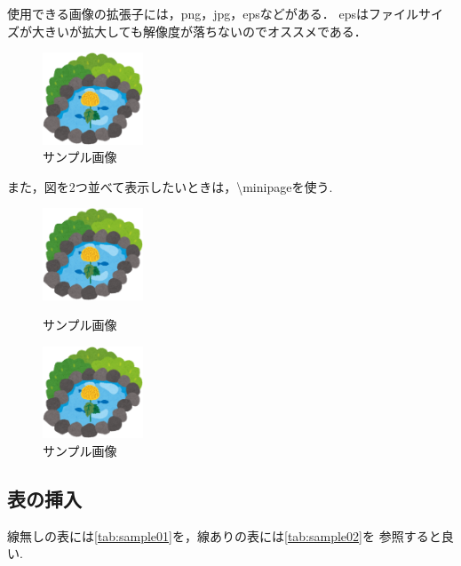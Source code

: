 \documentclass[titlepage,12pt,a4paper]{jarticle}
\begin{document}
使用できる画像の拡張子には，png，jpg，epsなどがある．
epsはファイルサイズが大きいが拡大しても解像度が落ちないのでオススメである．

\begin{figure}[h]
	\begin{center}
		\includegraphics[width=30mm]{img/kikpond.eps}
	 \end{center}
	\caption{サンプル画像}
	\label{fig:sample}
\end{figure}

また，図を2つ並べて表示したいときは，\textbackslash minipageを使う.

\begin{figure}[htbp]
  \begin{minipage}[b]{0.45\linewidth}
    \centering
    \includegraphics[keepaspectratio, width=30mm]{img/kikpond.eps}
    \caption{サンプル画像}
  \end{minipage}
  \begin{minipage}[b]{0.45\linewidth}
    \centering
    \includegraphics[keepaspectratio, width=30mm]{img/kikpond.eps}
    \caption{サンプル画像}
  \end{minipage}
\end{figure}



\subsection{表の挿入}
線無しの表には\ref{tab:sample01}を，線ありの表には\ref{tab:sample02}を
参照すると良い.
\end{document}
